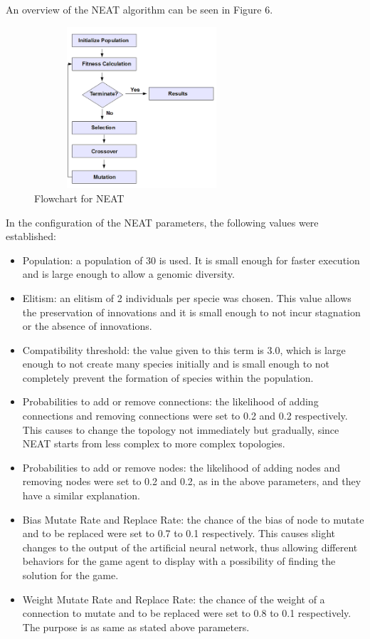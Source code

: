 \documentclass[journal]{IEEEtran}
\begin{document}
An overview of the NEAT algorithm can be seen in Figure 6.

\begin{figure}[htbp]
\begin{center}
\includegraphics[width=8cm, height=6cm]{GAprocess.png}
\caption{Flowchart for NEAT}
\end{center}
\end{figure}

In the configuration of the NEAT parameters, the following
values were established:
\begin{itemize}
\item Population: a population of 30 is used. It is small enough for faster execution and is large enough to allow a genomic diversity.
\item Elitism: an elitism of 2 individuals per specie was chosen. This value allows the preservation of innovations and it is small enough to not incur stagnation or the absence of innovations.
\item Compatibility threshold: the value given to this term is 3.0, which is large enough to not create many species initially and is small enough to not completely prevent the formation of species within the population.
\item Probabilities to add or remove connections: the likelihood
of adding connections and removing connections were set to 0.2 and 0.2 respectively. This causes to change the topology not immediately but gradually, since NEAT starts from less complex to more complex topologies.
\item Probabilities to add or remove nodes: the likelihood
of adding nodes and removing nodes were set to 0.2 and 0.2, as in the above parameters, and they have a similar explanation.
\item Bias Mutate Rate and Replace Rate: the chance of the bias of node to mutate and to be replaced were set to 0.7 to 0.1 respectively. This causes slight changes to the output of the artificial neural network, thus allowing different behaviors for the game agent to display with a possibility of finding the solution for the game.
\item Weight Mutate Rate and Replace Rate: the chance of the weight of a connection to mutate and to be replaced were set to 0.8 to 0.1 respectively. The purpose is as same as stated above parameters.
\end{itemize}
\end{document}
